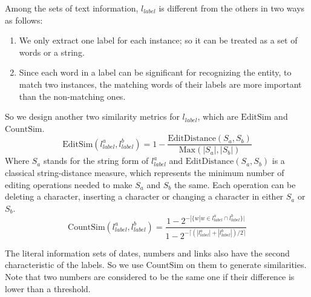 Among the sets of text information, $l_{label}$ is different from the others in two ways as follows:
\begin{enumerate}
    \item We only extract one label for each instance; so it can be treated as a set of words or a string.
    \item Since each word in a label can be significant for recognizing the entity, to match two instances, the matching words of their labels are more important than the non-matching ones.
\end{enumerate}
So we design another two similarity metrics for $l_{label}$, which are $\mathrm{EditSim}$ and $\mathrm{CountSim}$.
\begin{equation}
\mathrm{EditSim}(l_{label}^a, l_{label}^b) = 1 - \frac{\mathrm{EditDistance}(S_a, S_b)}{\mathrm{Max}(|S_a|, |S_b|)}
\end{equation}
Where $S_a$ stands for the string form of $l_{label}^a$ and $\mathrm{EditDistance}(S_a, S_b)$ is a classical string-distance measure, which represents the minimum number of editing operations needed to make $S_a$ and $S_b$ the same. Each operation can be deleting a character, inserting a character or changing a character in either $S_a$ or $S_b$.
\begin{equation}
\mathrm{CountSim}(l_{label}^a, l_{label}^b) = \frac{1 - 2^{-|\{w|w\in l_{label}^a\cap l_{label}^b\}|}}
                        {1 - 2^{-\lceil (|l_{label}^a|+|l_{label}^b|)/2 \rceil}}
\end{equation}

The literal information sets of dates, numbers and links also have the second characteristic of the labels. So we use $\mathrm{CountSim}$ on them to generate similarities. Note that two numbers are considered to be the same one if their difference is lower than a threshold.

